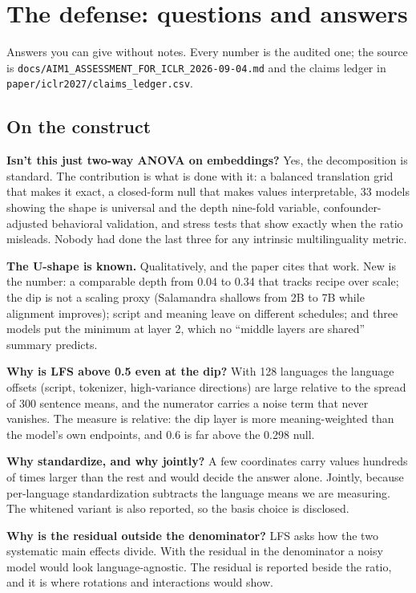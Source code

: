 \section{The defense: questions and answers}
\label{ch:defense}

Answers you can give without notes. Every number is the audited one; the
source is \texttt{docs/AIM1\_ASSESSMENT\_FOR\_ICLR\_2026-09-04.md} and the
claims ledger in \texttt{paper/iclr2027/claims\_ledger.csv}.

\subsection*{On the construct}

\textbf{Isn't this just two-way ANOVA on embeddings?}
Yes, the decomposition is standard. The contribution is what is done with it:
a balanced translation grid that makes it exact, a closed-form null that
makes values interpretable, 33 models showing the shape is universal and the
depth nine-fold variable, confounder-adjusted behavioral validation, and stress tests
that show exactly when the ratio misleads. Nobody had done the last three for
any intrinsic multilinguality metric.

\textbf{The U-shape is known.}
Qualitatively, and the paper cites that work. New is the number: a comparable
depth from 0.04 to 0.34 that tracks recipe over scale; the dip is not a
scaling proxy (Salamandra shallows from 2B to 7B while alignment improves);
script and meaning leave on different schedules; and three models put the
minimum at layer 2, which no ``middle layers are shared'' summary predicts.

\textbf{Why is LFS above 0.5 even at the dip?}
With 128 languages the language offsets (script, tokenizer, high-variance
directions) are large relative to the spread of 300 sentence means, and the
numerator carries a noise term that never vanishes. The measure is relative:
the dip layer is more meaning-weighted than the model's own endpoints, and
0.6 is far above the 0.298 null.

\textbf{Why standardize, and why jointly?}
A few coordinates carry values hundreds of times larger than the rest and
would decide the answer alone. Jointly, because per-language standardization
subtracts the language means we are measuring. The whitened variant is also
reported, so the basis choice is disclosed.

\textbf{Why is the residual outside the denominator?}
LFS asks how the two systematic main effects divide. With the residual in
the denominator a noisy model would look language-agnostic. The residual is
reported beside the ratio, and it is where rotations and interactions would
show.

